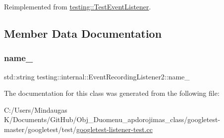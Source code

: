 Reimplemented from \mbox{\hyperlink{classtesting_1_1_test_event_listener_a2726cc70dfda861f109355f1d9f09dfe}{testing\+::\+Test\+Event\+Listener}}.



\subsection{Member Data Documentation}
\mbox{\label{classtesting_1_1internal_1_1_event_recording_listener2_a16a9dd6d3e89882b650d08c04450d101}} 
\subsubsection{\texorpdfstring{name\_}{name\_}}
{\footnotesize\ttfamily std\+::string testing\+::internal\+::\+Event\+Recording\+Listener2\+::name\+\_\+\hspace{0.3cm}{\ttfamily [private]}}



The documentation for this class was generated from the following file\+:\begin{DoxyCompactItemize}
\item 
C\+:/\+Users/\+Mindaugas K/\+Documents/\+Git\+Hub/\+Obj\+\_\+\+Duomenu\+\_\+apdorojimas\+\_\+class/googletest-\/master/googletest/test/\mbox{\hyperlink{googletest-master_2googletest_2test_2googletest-listener-test_8cc}{googletest-\/listener-\/test.\+cc}}\end{DoxyCompactItemize}
